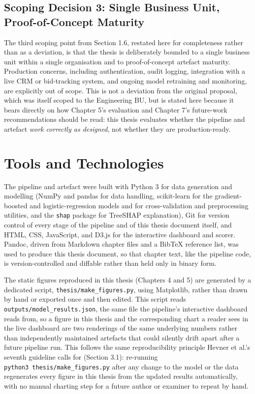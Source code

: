 \documentclass[12pt,oneside]{report}
\begin{document}
\hypertarget{scoping-decision-3-single-business-unit-proof-of-concept-maturity}{%
\subsection{Scoping Decision 3: Single Business Unit, Proof-of-Concept
Maturity}\label{scoping-decision-3-single-business-unit-proof-of-concept-maturity}}

The third scoping point from Section 1.6, restated here for completeness
rather than as a deviation, is that the thesis is deliberately bounded
to a single business unit within a single organisation and to
proof-of-concept artefact maturity. Production concerns, including
authentication, audit logging, integration with a live CRM or
bid-tracking system, and ongoing model retraining and monitoring, are
explicitly out of scope. This is not a deviation from the original
proposal, which was itself scoped to the Engineering BU, but is stated
here because it bears directly on how Chapter 5's evaluation and Chapter
7's future-work recommendations should be read: this thesis evaluates
whether the pipeline and artefact \emph{work correctly as designed}, not
whether they are production-ready.

\hypertarget{tools-and-technologies}{%
\section{Tools and Technologies}\label{tools-and-technologies}}

The pipeline and artefact were built with Python 3 for data generation
and modelling (NumPy and pandas for data handling, scikit-learn for the
gradient-boosted and logistic-regression models and for cross-validation
and preprocessing utilities, and the \texttt{shap} package for TreeSHAP
explanation), Git for version control of every stage of the pipeline and
of this thesis document itself, and HTML, CSS, JavaScript, and D3.js for
the interactive dashboard and scorer. Pandoc, driven from Markdown
chapter files and a BibTeX reference list, was used to produce this
thesis document, so that chapter text, like the pipeline code, is
version-controlled and diffable rather than held only in binary form.

The static figures reproduced in this thesis (Chapters 4 and 5) are
generated by a dedicated script, \texttt{thesis/make\_figures.py}, using
Matplotlib, rather than drawn by hand or exported once and then edited.
This script reads \texttt{outputs/model\_results.json}, the same file
the pipeline's interactive dashboard reads from, so a figure in this
thesis and the corresponding chart a reader sees in the live dashboard
are two renderings of the same underlying numbers rather than
independently maintained artefacts that could silently drift apart after
a future pipeline run. This follows the same reproducibility principle
Hevner et al.'s \citeyearpar{hevner2004design} seventh guideline calls
for (Section 3.1): re-running \texttt{python3\ thesis/make\_figures.py}
after any change to the model or the data regenerates every figure in
this thesis from the updated results automatically, with no manual
charting step for a future author or examiner to repeat by hand.
\end{document}

